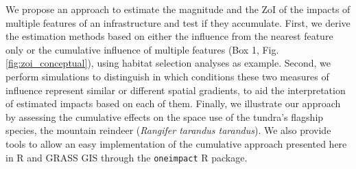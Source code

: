 \documentclass[titlepage]{article}
\begin{document}
We propose an approach to estimate the magnitude and the ZoI of the impacts of multiple features of an infrastructure and test if they accumulate. First, we derive the estimation methods based on either the influence from the nearest feature only or the cumulative influence of multiple features (Box 1, Fig. \ref{fig:zoi_conceptual}), using habitat selection analyses as example. Second, we perform simulations to distinguish in which conditions these two measures of influence represent similar or different spatial gradients, to aid the interpretation of estimated impacts based on each of them. 
Finally, we illustrate our approach by assessing the cumulative effects on the space use of the tundra's flagship species, the mountain reindeer (\textit{Rangifer tarandus tarandus}). We also provide tools to allow an easy implementation of the cumulative approach presented here in R \citep{r_core_team_r_2020} and GRASS GIS \citep{grass_development_team_geographic_2017} through the \verb|oneimpact| R package.
\end{document}
